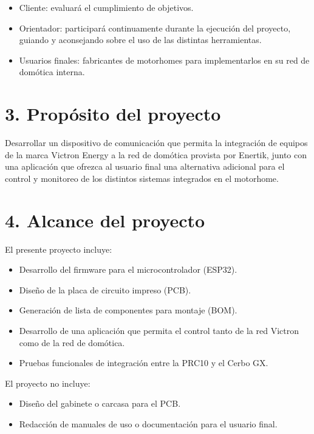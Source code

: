 \documentclass[
11pt, %
]{charter}
\begin{document}
\begin{itemize}
	\item Cliente: evaluará el cumplimiento de objetivos.
	\item Orientador: participará continuamente durante la ejecución del proyecto, guiando y aconsejando sobre el uso de las distintas herramientas.
	\item Usuarios finales: fabricantes de motorhomes para implementarlos en su red de domótica interna.
\end{itemize}


\section{3. Propósito del proyecto}
\label{sec:proposito}

Desarrollar un dispositivo de comunicación que permita la integración de equipos de la marca Victron Energy a la red de domótica provista por Enertik, junto con una aplicación que ofrezca al usuario final una alternativa adicional para el control y monitoreo de los distintos sistemas integrados en el motorhome.

\section{4. Alcance del proyecto}
\label{sec:alcance}

El presente proyecto incluye:

\begin{itemize}
	\item Desarrollo del firmware para el microcontrolador (ESP32).
	\item Diseño de la placa de circuito impreso (PCB).
	\item Generación de lista de componentes para montaje (BOM).
	\item Desarrollo de una aplicación que permita el control tanto de la red Victron como de la red de domótica.
	\item Pruebas funcionales de integración entre la PRC10 y el Cerbo GX.	
\end{itemize}

El proyecto no incluye:
\begin{itemize}
	\item Diseño del gabinete o carcasa para el PCB.
	\item Redacción de manuales de uso o documentación para el usuario final.	
\end{itemize}
\end{document}
